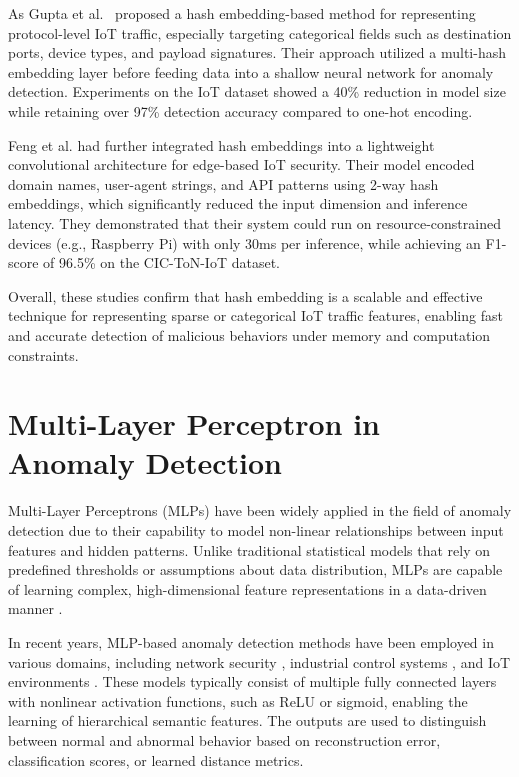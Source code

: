 \begin{ZhChapter}
    As Gupta et al.~\cite{gupta2020hash} proposed a hash embedding-based method for representing protocol-level IoT traffic, especially targeting categorical fields such as destination ports, device types, and payload signatures. Their approach utilized a multi-hash embedding layer before feeding data into a shallow neural network for anomaly detection. Experiments on the IoT dataset showed a 40\% reduction in model size while retaining over 97\% detection accuracy compared to one-hot encoding.

    Feng et al. \cite{feng2021lightweight} had further integrated hash embeddings into a lightweight convolutional architecture for edge-based IoT security. Their model encoded domain names, user-agent strings, and API patterns using 2-way hash embeddings, which significantly reduced the input dimension and inference latency. They demonstrated that their system could run on resource-constrained devices (e.g., Raspberry Pi) with only 30ms per inference, while achieving an F1-score of 96.5\% on the CIC-ToN-IoT dataset.


    Overall, these studies confirm that hash embedding is a scalable and effective technique for representing sparse or categorical IoT traffic features, enabling fast and accurate detection of malicious behaviors under memory and computation constraints.




    \section{Multi-Layer Perceptron in Anomaly Detection}
    Multi-Layer Perceptrons (MLPs) have been widely applied in the field of anomaly detection due to their capability to model non-linear relationships between input features and hidden patterns. Unlike traditional statistical models that rely on predefined thresholds or assumptions about data distribution, MLPs are capable of learning complex, high-dimensional feature representations in a data-driven manner   \cite{lecun2015deep}.

    In recent years, MLP-based anomaly detection methods have been employed in various domains, including network security \cite{moustafa2019new}, industrial control systems \cite{kim2020cyber}, and IoT environments \cite{nguyen2020autoencoder}. These models typically consist of multiple fully connected layers with nonlinear activation functions, such as ReLU or sigmoid, enabling the learning of hierarchical semantic features. The outputs are used to distinguish between normal and abnormal behavior based on reconstruction error, classification scores, or learned distance metrics.



\end{ZhChapter}
